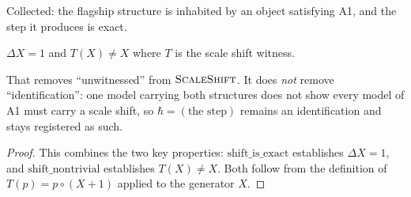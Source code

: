 \begin{theorem}
\label{thm:scaleShift_is_witnessed}
Collected: the flagship structure is inhabited by an object satisfying
A1, and the step it produces is exact. 

$\Delta X = 1$ and $T(X) \neq X$ where $T$ is the scale shift witness.

That removes ``unwitnessed'' from $\text{\textsc{ScaleShift}}$.  It does \emph{not} remove
``identification'': one model carrying both structures does not show every model
of A1 must carry a scale shift, so $\hbar = (\text{the step})$ remains an identification and
stays registered as such.

\begin{proof}
This combines the two key properties: $\text{shift\_is\_exact}$ establishes
$\Delta X = 1$, and $\text{shift\_nontrivial}$ establishes $T(X) \neq X$.
Both follow from the definition of $T(p) = p \circ (X+1)$ applied to the generator $X$.
\end{proof}
\end{theorem}
